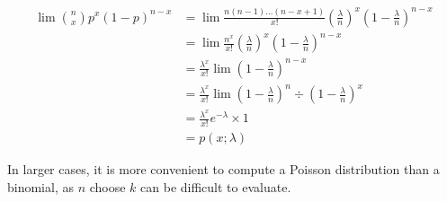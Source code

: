 \documentclass[12pt]{article}
\begin{document}
\begin{align*}
	\lim \binom{n}{x}p^x(1-p)^{n-x} &= \lim  \frac{n(n-1)\dots(n-x+1)}{x!} \left(\frac{\lambda}{n}\right)^x \left(1-\frac{\lambda}{n}\right)^{n-x} \\
					&= \lim \frac{n^x}{x!}\left(\frac{\lambda}{n}\right)^x\left(1-\frac{\lambda}{n}\right)^{n-x} \\
					&= \frac{\lambda^x}{x!} \lim \left(1-\frac{\lambda}{n}\right)^{n-x} \\
					&= \frac{\lambda^x}{x!} \lim \left(1-\frac{\lambda}{n}\right)^n\div\left(1-\frac{\lambda}{n}\right)^x \\
					&= \frac{\lambda^x}{x!} e^{-\lambda} \times 1 \\
					&= p(x;\lambda)
\end{align*}

In larger cases, it is more convenient to compute a Poisson distribution than a binomial, as $n$ choose $k$ can be difficult to evaluate.
\end{document}
